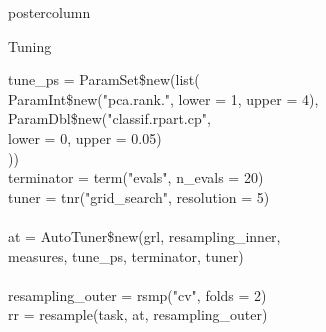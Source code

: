 \documentclass{beamer}
\begin{document}
\begin{frame}[fragile]{}
\begin{columns}
\begin{column}{.245\textwidth}
\begin{beamercolorbox}[center]{postercolumn}
\begin{minipage}{.98\textwidth}
{\begin{myblock}{Tuning}
\begin{codeboxexample}
{                tune\_ps = ParamSet\$new(list(\\
                \hspace*{1ex} ParamInt\$new("pca.rank.", lower = 1, upper = 4),\\
                \hspace*{1ex} ParamDbl\$new("classif.rpart.cp",\\
                \hspace*{2ex} lower = 0, upper = 0.05)\\
                ))\\
                terminator = term("evals", n\_evals = 20)\\
                tuner = tnr("grid\_search", resolution = 5)\\
                \ \\
                at = AutoTuner\$new(grl, resampling\_inner,\\
                \hspace*{1ex} measures, tune\_ps, terminator, tuner)\\
                \ \\
                resampling\_outer = rsmp("cv", folds = 2)\\
                rr = resample(task, at, resampling\_outer)}
					    \end{codeboxexample}
            \end{myblock}
						\vfill}
				\end{minipage}
			\end{beamercolorbox}
		\end{column}
	\end{columns}
\end{frame}
\end{document}
